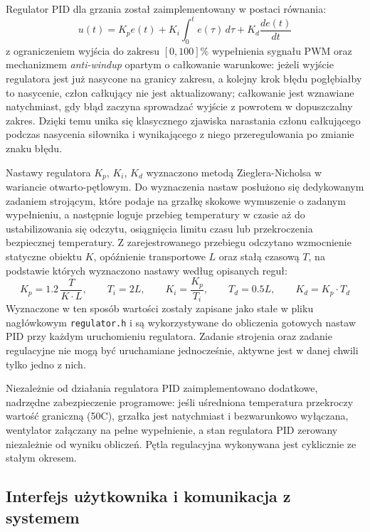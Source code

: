 \documentclass{article}
\begin{document}
\medskip
Regulator PID dla grzania został zaimplementowany w postaci równania:
\begin{equation}
    u(t) = K_p e(t) + K_i \int_0^t e(\tau)\, d\tau + K_d \frac{de(t)}{dt}
\end{equation}
z ograniczeniem wyjścia do zakresu $[0, 100]\%$ wypełnienia sygnału PWM oraz mechanizmem \emph{anti-windup} opartym o całkowanie warunkowe: jeżeli wyjście regulatora jest już nasycone na granicy zakresu, a kolejny krok błędu pogłębiałby to nasycenie, człon całkujący nie jest aktualizowany; całkowanie jest wznawiane natychmiast, gdy błąd zaczyna sprowadzać wyjście z powrotem w dopuszczalny zakres. Dzięki temu unika się klasycznego zjawiska narastania członu całkującego podczas nasycenia siłownika i wynikającego z niego przeregulowania po zmianie znaku błędu.

\medskip
Nastawy regulatora $K_p$, $K_i$, $K_d$ wyznaczono metodą Zieglera-Nicholsa w wariancie otwarto-pętlowym. Do wyznaczenia nastaw posłużono się dedykowanym zadaniem strojącym, które podaje na grzałkę skokowe wymuszenie o zadanym wypełnieniu, a następnie loguje przebieg temperatury w czasie aż do ustabilizowania się odczytu, osiągnięcia limitu czasu lub przekroczenia bezpiecznej temperatury. Z zarejestrowanego przebiegu odczytano wzmocnienie statyczne obiektu $K$, opóźnienie transportowe $L$ oraz stałą czasową $T$, na podstawie których wyznaczono nastawy według opisanych reguł:
\begin{equation}
    K_p = 1.2\,\frac{T}{K \cdot L}, \qquad T_i = 2L, \qquad K_i = \frac{K_p}{T_i}, \qquad T_d = 0.5L, \qquad K_d = K_p \cdot T_d
\end{equation}
Wyznaczone w ten sposób wartości zostały zapisane jako stałe w pliku nagłówkowym \texttt{regulator.h} i są wykorzystywane do obliczenia gotowych nastaw PID przy każdym uruchomieniu regulatora. Zadanie strojenia oraz zadanie regulacyjne nie mogą być uruchamiane jednocześnie, aktywne jest w danej chwili tylko jedno z nich.

\medskip
Niezależnie od działania regulatora PID zaimplementowano dodatkowe, nadrzędne zabezpieczenie programowe: jeśli uśredniona temperatura przekroczy wartość graniczną (50\textdegree C), grzałka jest natychmiast i bezwarunkowo wyłączana, wentylator załączany na pełne wypełnienie, a stan regulatora PID zerowany niezależnie od wyniku obliczeń. Pętla regulacyjna wykonywana jest cyklicznie ze stałym okresem.

\subsection{Interfejs użytkownika i komunikacja z systemem}
\end{document}
